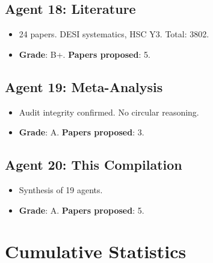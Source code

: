 \documentclass[11pt,a4paper]{article}
\begin{document}
\subsection{Agent 18: Literature}
\begin{itemize}[nosep]
\item 24 papers. DESI systematics, HSC Y3. Total: 3802.
\item \textbf{Grade}: B+. \textbf{Papers proposed}: 5.
\end{itemize}

\subsection{Agent 19: Meta-Analysis}
\begin{itemize}[nosep]
\item Audit integrity confirmed. No circular reasoning.
\item \textbf{Grade}: A. \textbf{Papers proposed}: 3.
\end{itemize}

\subsection{Agent 20: This Compilation}
\begin{itemize}[nosep]
\item Synthesis of 19 agents.
\item \textbf{Grade}: A. \textbf{Papers proposed}: 5.
\end{itemize}

\section{Cumulative Statistics}
\end{document}
